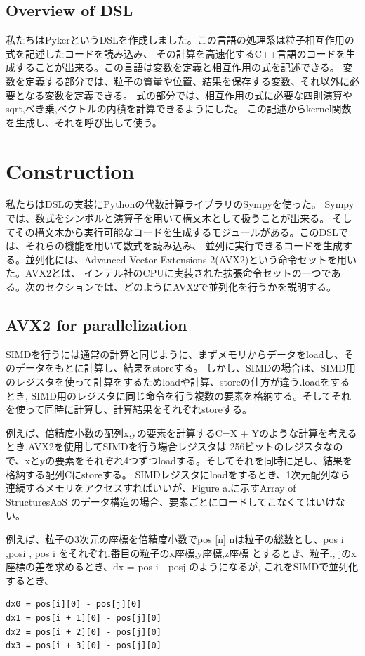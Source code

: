 \documentclass{jarticle}
\begin{document}
\subsection{Overview of DSL}
私たちはPykerというDSLを作成しました。この言語の処理系は粒子相互作用の式を記述したコードを読み込み、
その計算を高速化するC++言語のコードを生成することが出来る。この言語は変数を定義と相互作用の式を記述できる。
変数を定義する部分では、粒子の質量や位置、結果を保存する変数、それ以外に必要となる変数を定義できる。
式の部分では、相互作用の式に必要な四則演算やsqrt,べき乗,ベクトルの内積を計算できるようにした。
この記述からkernel関数を生成し、それを呼び出して使う。



\section{Construction}
私たちはDSLの実装にPythonの代数計算ライブラリのSympyを使った。
Sympyでは、数式をシンボルと演算子を用いて構文木として扱うことが出来る。
そしてその構文木から実行可能なコードを生成するモジュールがある。このDSLでは、それらの機能を用いて数式を読み込み、
並列に実行できるコードを生成する。並列化には、Advanced Vector Extensions 2(AVX2)という命令セットを用いた。AVX2とは、
インテル社のCPUに実装された拡張命令セットの一つである。次のセクションでは、どのようにAVX2で並列化を行うかを説明する。

\subsection{AVX2 for parallelization}

SIMDを行うには通常の計算と同じように、まずメモリからデータをloadし、そのデータをもとに計算し、結果をstoreする。
しかし、SIMDの場合は、SIMD用のレジスタを使って計算をするためloadや計算、storeの仕方が違う.loadをするとき,
SIMD用のレジスタに同じ命令を行う複数の要素を格納する。そしてそれを使って同時に計算し、計算結果をそれぞれstoreする。

 例えば、倍精度小数の配列x,yの要素を計算するC=X + Yのような計算を考えるとき,AVX2を使用してSIMDを行う場合レジスタは
256ビットのレジスタなので、xとyの要素をそれぞれ4つずつloadする。そしてそれを同時に足し、結果を格納する配列Cにstoreする。
SIMDレジスタにloadをするとき、1次元配列なら連続するメモリをアクセスすればいいが、Figure a.に示すArray of Structures\lparen AoS \rparen
のデータ構造の場合、要素ごとにロードしてこなくてはいけない。

 例えば、粒子の3次元の座標を倍精度小数でpos [n] \rbrack 
 \lparen nは粒子の総数とし、pos \lbrack i \rbrack {}\rbrack ,pos\lbrack i \rbrack {} \rbrack, pos \lbrack i \rbrack {} \rbrack をそれぞれi番目の粒子のx座標,y座標,z座標 \rparen
  とするとき、粒子i, jのx座標の差を求めるとき、dx = pos \lbrack i \rbrack {} \rbrack - pos\lbrack j \rbrack {} \rbrack のようになるが,
これをSIMDで並列化するとき、
\begin{lstlisting}[frame=single]
dx0 = pos[i][0] - pos[j][0]
dx1 = pos[i + 1][0] - pos[j][0]
dx2 = pos[i + 2][0] - pos[j][0]
dx3 = pos[i + 3][0] - pos[j][0]
\end{lstlisting}
  
\end{document}
